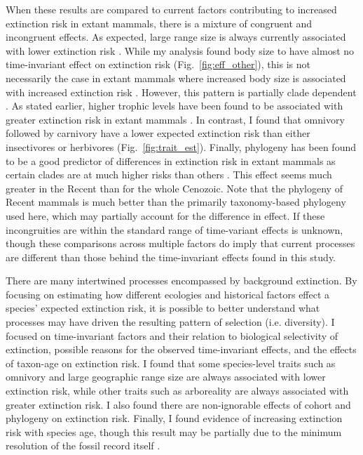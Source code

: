 \documentclass[12pt]{article}
\begin{document}
When these results are compared to current factors contributing to increased extinction risk in extant mammals, there is a mixture of congruent and incongruent effects. As expected, large range size is always currently associated with lower extinction risk \cite{Fritz2009,Fritz2010b,Liow2009,Purvis2000a}. While my analysis found body size to have almost no time-invariant effect on extinction risk (Fig.~\ref{fig:eff_other}), this is not necessarily the case in extant mammals where increased body size is associated with increased extinction risk \cite{Liow2009,Purvis2000a}. However, this pattern is partially clade dependent \cite{Fritz2009}. As stated earlier, higher trophic levels have been found to be associated with greater extinction risk in extant mammals \cite{Purvis2000a,Liow2009}. In contrast, I found that omnivory followed by carnivory have a lower expected extinction risk than either insectivores or herbivores (Fig.~\ref{fig:trait_est}). Finally, phylogeny has been found to be a good predictor of differences in extinction risk in extant mammals as certain clades are at much higher risks than others \cite{Fritz2010b}. This effect seems much greater in the Recent than for the whole Cenozoic. Note that the phylogeny of Recent mammals is much better than the primarily taxonomy-based phylogeny used here, which may partially account for the difference in effect. If these incongruities are within the standard range of time-variant effects is unknown, though these comparisons across multiple factors do imply that current processes are different than those behind the time-invariant effects found in this study. 

There are many intertwined processes encompassed by background extinction. By focusing on estimating how different ecologies and historical factors effect a species' expected extinction risk, it is possible to better understand what processes may have driven the resulting pattern of selection (i.e. diversity). I focused on time-invariant factors and their relation to biological selectivity of extinction, possible reasons for the observed time-invariant effects, and the effects of taxon-age on extinction risk. I found that some species-level traits such as omnivory and large geographic range size are always associated with lower extinction risk, while other traits such as arboreality are always associated with greater extinction risk. I also found there are non-ignorable effects of cohort and phylogeny on extinction risk. Finally, I found evidence of increasing extinction risk with species age, though this result may be partially due to the minimum resolution of the fossil record itself \cite{Sepkoski1975}.
\end{document}

